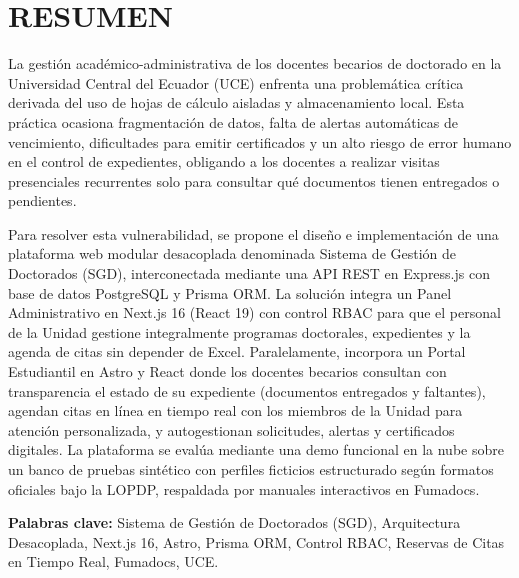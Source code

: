 
\pagestyle{empty}
\onehalfspacing
\fontsize{12}{18}\selectfont

\section*{RESUMEN}

La gestión académico-administrativa de los docentes becarios de doctorado en la Universidad Central del Ecuador (UCE) enfrenta una problemática crítica derivada del uso de hojas de cálculo aisladas y almacenamiento local. Esta práctica ocasiona fragmentación de datos, falta de alertas automáticas de vencimiento, dificultades para emitir certificados y un alto riesgo de error humano en el control de expedientes, obligando a los docentes a realizar visitas presenciales recurrentes solo para consultar qué documentos tienen entregados o pendientes.

Para resolver esta vulnerabilidad, se propone el diseño e implementación de una plataforma web modular desacoplada denominada Sistema de Gestión de Doctorados (SGD), interconectada mediante una API REST en Express.js con base de datos PostgreSQL y Prisma ORM. La solución integra un Panel Administrativo en Next.js 16 (React 19) con control RBAC para que el personal de la Unidad gestione integralmente programas doctorales, expedientes y la agenda de citas sin depender de Excel. Paralelamente, incorpora un Portal Estudiantil en Astro y React donde los docentes becarios consultan con transparencia el estado de su expediente (documentos entregados y faltantes), agendan citas en línea en tiempo real con los miembros de la Unidad para atención personalizada, y autogestionan solicitudes, alertas y certificados digitales. La plataforma se evalúa mediante una demo funcional en la nube sobre un banco de pruebas sintético con perfiles ficticios estructurado según formatos oficiales bajo la LOPDP, respaldada por manuales interactivos en Fumadocs.

\vspace{0.5cm}
\textbf{Palabras clave:} Sistema de Gestión de Doctorados (SGD), Arquitectura Desacoplada, Next.js 16, Astro, Prisma ORM, Control RBAC, Reservas de Citas en Tiempo Real, Fumadocs, UCE.

\newpage
